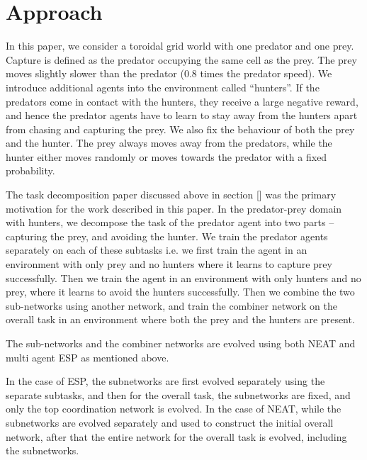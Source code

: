 \section{Approach}
In this paper, we consider a toroidal grid world with one predator and one prey. Capture is defined as the predator occupying the same cell as the prey. The prey moves slightly slower than the predator (0.8 times the predator speed). We introduce additional agents into the environment called “hunters”. If the predators come in contact with the hunters, they receive a large negative reward, and hence the predator agents have to learn to stay away from the hunters apart from chasing and capturing the prey. We also fix the behaviour of both the prey and the hunter. The prey always moves away from the predators, while the hunter either moves randomly or moves towards the predator with a fixed probability.

The task decomposition paper discussed above in section []  was the primary
motivation for the work described in this paper. In the predator-prey domain
with hunters, we decompose the task of the predator agent into two parts --
capturing the prey, and avoiding the hunter. We train the predator agents
separately on each of these subtasks i.e. we first train the agent in an environment with only prey and no hunters where it learns to capture prey successfully. Then we train the agent in an environment with only hunters and no prey, where it learns to avoid the hunters successfully. Then we combine the two sub-networks using another network, and train the combiner network on the overall task in an environment where both the prey and the hunters are present. 

The sub-networks and the combiner networks are evolved using both NEAT and multi agent ESP as mentioned above.

In the case of ESP, the subnetworks are first evolved separately using the separate subtasks, and then for the overall task, the subnetworks are fixed, and only the top coordination network is evolved. In the case of NEAT, while the subnetworks are evolved separately and used to construct the initial overall network, after that the entire network for the overall task is evolved, including the subnetworks.
